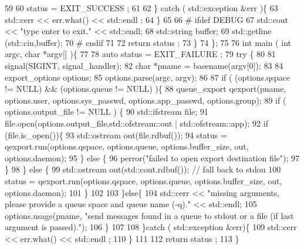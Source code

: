 \begin{DoxyCodeInclude}
59 
60         status = EXIT\_SUCCESS ;
61 
62       \} catch ( std::exception &err )\{
63         std::cerr << err.what() << std::endl ;
64       \}
65 
66 #     ifdef DEBUG
67       std::cout << "type enter to exit." << std::endl;
68       std::string buffer;
69       std::getline (std::cin,buffer);
70 #     endif
71 
72       return status ;
73     \}
74 \};
75 
76 int main ( int argc, char *argv[] )\{
77 
78   auto status = EXIT\_FAILURE ;
79   try \{
80 
81     signal(SIGINT, signal\_handler);
82     char *pname = basename(argv[0]);
83 
84     export\_options options;
85     options.parse(argc, argv);
86 
87     if ( (options.qspace != NULL) && (options.queue != NULL) )\{
88       queue\_export qexport(pname, options.user, options.sys\_passwd, options.app\_passwd, options.group);
89       if ( options.output\_file != NULL ) \{
90         std::ifstream file;
91         file.open(options.output\_file,std::ofstream::out | std::ofstream::app);
92         if (file.is\_open())\{
93           std::ostream out(file.rdbuf());
94           status = qexport.run(options.qspace, options.queue, options.buffer\_size, out, options.daemon);
95         \} else \{
96           perror("failed to open export destination file");
97         \}
98       \} else \{
99         std::ostream out(std::cout.rdbuf()); // fall back to stdou
100         status = qexport.run(options.qspace, options.queue, options.buffer\_size, out, options.daemon);
101       \}
102 
103     \}else\{
104       std::cerr << "missing arguments, please provide a queue space and queue name (-q)." << std::endl;
105       options.usage(pname, "send messages found in a queue to stdout or a file (if last argument is
       passed).");
106     \}
107 
108   \}catch ( std::exception &err)\{
109     std::cerr << err.what() << std::endl ;
110   \}
111 
112   return status ;
113 \}
\end{DoxyCodeInclude}
 